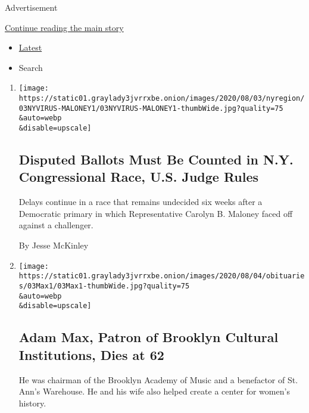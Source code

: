 Advertisement

\protect\hyperlink{after-mid1}{Continue reading the main story}

\begin{itemize}
\tightlist
\item
  \protect\hyperlink{stream-panel}{Latest}
\item
  Search
\end{itemize}

\begin{enumerate}
\def\labelenumi{\arabic{enumi}.}
\item
  \href{/2020/08/03/nyregion/nyc-congress-carolyn-mahoney-ballots.html}{}

  \texttt{[image: https://static01.graylady3jvrrxbe.onion/images/2020/08/03/nyregion/03NYVIRUS-MALONEY1/03NYVIRUS-MALONEY1-thumbWide.jpg?quality=75\\\&auto=webp\\\&disable=upscale]}

  \hypertarget{disputed-ballots-must-be-counted-in-ny-congressional-race-us-judge-rules}{%
  \subsection{Disputed Ballots Must Be Counted in N.Y. Congressional
  Race, U.S. Judge
  Rules}\label{disputed-ballots-must-be-counted-in-ny-congressional-race-us-judge-rules}}

  Delays continue in a race that remains undecided six weeks after a
  Democratic primary in which Representative Carolyn B. Maloney faced
  off against a challenger.

  By Jesse McKinley
\item
  \href{/2020/08/03/arts/adam-max-patron-of-brooklyn-cultural-institutions-dies-at-62.html}{}

  \texttt{[image: https://static01.graylady3jvrrxbe.onion/images/2020/08/04/obituaries/03Max1/03Max1-thumbWide.jpg?quality=75\\\&auto=webp\\\&disable=upscale]}

  \hypertarget{adam-max-patron-of-brooklyn-cultural-institutions-dies-at-62}{%
  \subsection{Adam Max, Patron of Brooklyn Cultural Institutions, Dies
  at
  62}\label{adam-max-patron-of-brooklyn-cultural-institutions-dies-at-62}}

  He was chairman of the Brooklyn Academy of Music and a benefactor of
  St. Ann's Warehouse. He and his wife also helped create a center for
  women's history.


\end{enumerate}
